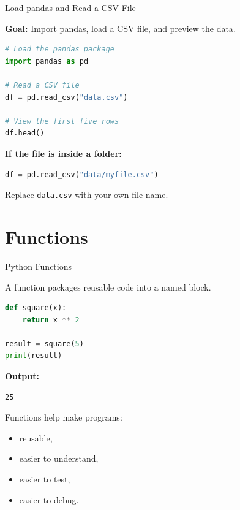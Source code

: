 \documentclass[aspectratio=43]{beamer}
\begin{document}
\begin{frame}[fragile]{Load pandas and Read a CSV File}

\textbf{Goal:} Import pandas, load a CSV file, and preview the data.

\vspace{0.4em}

\begin{lstlisting}[language=Python]
# Load the pandas package
import pandas as pd

# Read a CSV file
df = pd.read_csv("data.csv")

# View the first five rows
df.head()
\end{lstlisting}

\vspace{0.4em}

\textbf{If the file is inside a folder:}

\begin{lstlisting}[language=Python]
df = pd.read_csv("data/myfile.csv")
\end{lstlisting}

\vspace{0.3em}

Replace \texttt{data.csv} with your own file name.

\end{frame}

\section{Functions}

\begin{frame}[fragile]{Python Functions}

A function packages reusable code into a named block.

\begin{lstlisting}[language=Python]
def square(x):
    return x ** 2

result = square(5)
print(result)
\end{lstlisting}

\textbf{Output:}

\begin{lstlisting}
25
\end{lstlisting}

Functions help make programs:

\begin{itemize}
  \item reusable,
  \item easier to understand,
  \item easier to test,
  \item easier to debug.
\end{itemize}

\end{frame}
\end{document}
